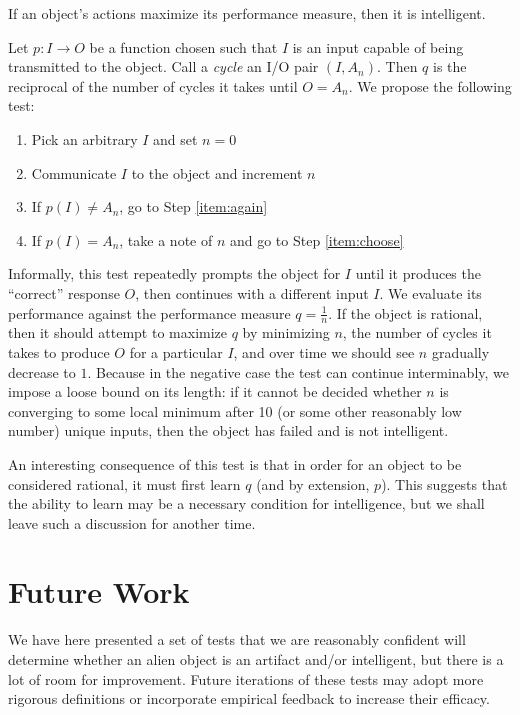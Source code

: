 \documentclass[12pt,letterpaper]{article}
\begin{document}
If an object's actions maximize its performance measure, then it is intelligent.

Let $p : I \to O$ be a function chosen such that $I$ is an input capable of being transmitted to the object. Call a \emph{cycle} an I/O pair $(I, A_n)$. Then $q$ is the reciprocal of the number of cycles it takes until $O = A_n$. We propose the following test:

\begin{enumerate}
	\singlespacing
	\item\label{item:choose} Pick an arbitrary $I$ and set $n = 0$
	\item\label{item:again} Communicate $I$ to the object and increment $n$
	\item If $p(I) \neq A_n$, go to Step \ref{item:again}
	\item If $p(I) = A_n$, take a note of $n$ and go to Step \ref{item:choose}
\end{enumerate}

Informally, this test repeatedly prompts the object for $I$ until it produces the ``correct'' response $O$, then continues with a different input $I$. We evaluate its performance against the performance measure $q = \frac{1}{n}$. If the object is rational, then it should attempt to maximize $q$ by minimizing $n$, the number of cycles it takes to produce $O$ for a particular $I$, and over time we should see $n$ gradually decrease to $1$. Because in the negative case the test can continue interminably, we impose a loose bound on its length: if it cannot be decided whether $n$ is converging to some local minimum after 10 (or some other reasonably low number) unique inputs, then the object has failed and is not intelligent.

An interesting consequence of this test is that in order for an object to be considered rational, it must first learn $q$ (and by extension, $p$). This suggests that the ability to learn may be a necessary condition for intelligence, but we shall leave such a discussion for another time.

\section*{Future Work}

We have here presented a set of tests that we are reasonably confident will determine whether an alien object is an artifact and/or intelligent, but there is a lot of room for improvement. Future iterations of these tests may adopt more rigorous definitions or incorporate empirical feedback to increase their efficacy.
\end{document}
